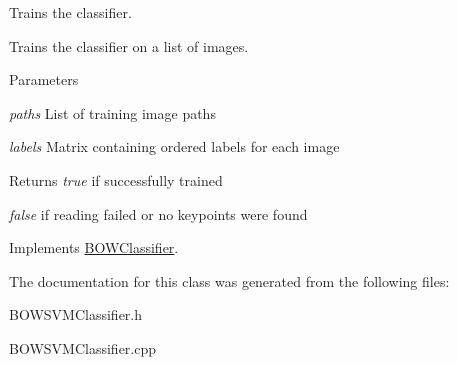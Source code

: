 Trains the classifier. 

Trains the classifier on a list of images.


\begin{DoxyParams}{Parameters}
\item[{\em paths}]List of training image paths \item[{\em labels}]Matrix containing ordered labels for each image \end{DoxyParams}
\begin{DoxyReturn}{Returns}
{\itshape true\/} if successfully trained\par
 {\itshape false\/} if reading failed or no keypoints were found 
\end{DoxyReturn}


Implements \hyperlink{classBOWClassifier_a8a00f5cadf166f361a411d5a4e67b4d6}{BOWClassifier}.



The documentation for this class was generated from the following files:\begin{DoxyCompactItemize}
\item 
BOWSVMClassifier.h\item 
BOWSVMClassifier.cpp\end{DoxyCompactItemize}

